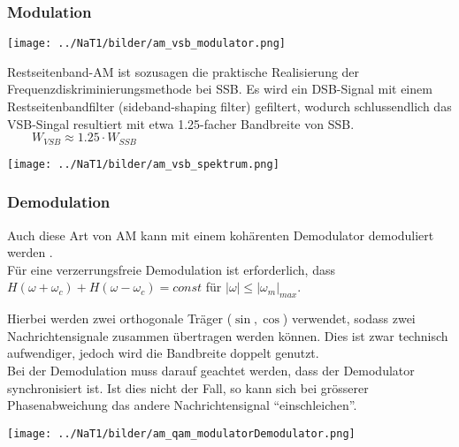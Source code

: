 \subsubsection{Modulation}
\begin{minipage}[t][2.2cm][c]{5.5cm}
    \texttt{[image: ../NaT1/bilder/am\_vsb\_modulator.png]}
\end{minipage}
\begin{minipage}[t][2.2cm][c]{12.5cm}	
Restseitenband-AM ist sozusagen die praktische Realisierung der Frequenzdiskriminierungsmethode bei
SSB. Es wird ein DSB-Signal mit einem Restseitenbandfilter (sideband-shaping filter) gefiltert,
wodurch schlussendlich das VSB-Singal resultiert mit etwa 1.25-facher Bandbreite von SSB.
$ \qquad  W_{VSB} \approx 1.25 \cdot W_{SSB} $
\end{minipage}
\begin{center}
    \texttt{[image: ../NaT1/bilder/am\_vsb\_spektrum.png]}
\end{center}

\subsubsection{Demodulation}
Auch diese Art von AM kann mit einem kohärenten Demodulator demoduliert
werden .\\
Für eine verzerrungsfreie Demodulation ist erforderlich, dass $H(\omega +
\omega_c) + H(\omega - \omega_c) = const$ für $|\omega| \leq |\omega_m|_{max}$.



Hierbei werden zwei orthogonale Träger ($\sin, \cos$) verwendet, sodass zwei Nachrichtensignale
zusammen übertragen werden können. Dies ist zwar technisch aufwendiger, jedoch wird die Bandbreite
doppelt genutzt. \\
Bei der Demodulation muss darauf geachtet werden, dass der Demodulator synchronisiert ist. Ist dies
nicht der Fall, so kann sich bei grösserer Phasenabweichung das andere Nachrichtensignal
``einschleichen''.
\begin{center}
    \texttt{[image: ../NaT1/bilder/am\_qam\_modulatorDemodulator.png]}
\end{center}
